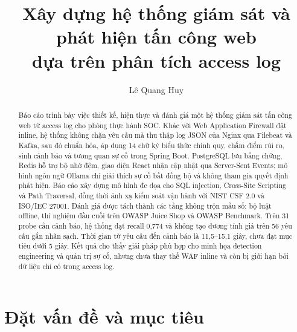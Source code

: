 \documentclass[runningheads]{report-template/llncs}
\begin{document}
\title{\texorpdfstring{Xây dựng hệ thống giám sát và phát hiện tấn công web\\
dựa trên phân tích access log}{Xây dựng hệ thống giám sát và phát hiện
tấn công web dựa trên phân tích access log}}

\author{Lê Quang Huy}

\maketitle

\begin{abstract}
Báo cáo trình bày việc thiết kế, hiện thực và đánh giá một hệ thống giám
sát tấn công web từ access log cho phòng thực hành SOC. Khác với Web
Application Firewall đặt inline, hệ thống không chặn yêu cầu mà thu thập
log JSON của Nginx qua Filebeat và Kafka, sau đó chuẩn hóa, áp dụng 14
chữ ký biểu thức chính quy, chấm điểm rủi ro, sinh cảnh báo và tương quan
sự cố trong Spring Boot. PostgreSQL lưu bằng chứng, Redis hỗ trợ bộ nhớ
đệm, giao diện React nhận cập nhật qua Server-Sent Events; mô hình ngôn
ngữ Ollama chỉ giải thích sự cố bất đồng bộ và không tham gia quyết định
phát hiện. Báo cáo xây dựng mô hình đe dọa cho SQL injection, Cross-Site
Scripting và Path Traversal, đồng thời ánh xạ kiểm soát vận hành với NIST
CSF 2.0 và ISO/IEC 27001. Đánh giá được tách thành các tầng không trộn
mẫu số: bộ luật offline, thí nghiệm đầu cuối trên OWASP Juice Shop và
OWASP Benchmark. Trên 31 probe cần cảnh báo, hệ thống đạt recall 0,774
và không tạo dương tính giả trên 56 yêu cầu gắn nhãn sạch. Thời gian từ
yêu cầu đến cảnh báo là 11,5--15,1 giây, chưa đạt mục tiêu dưới 5 giây.
Kết quả cho thấy giải pháp phù hợp cho minh họa detection engineering và
quản trị sự cố, nhưng chưa thay thế WAF inline và còn bị giới hạn bởi dữ
liệu chỉ có trong access log.

\end{abstract}

\section{Đặt vấn đề và mục tiêu}
\end{document}

